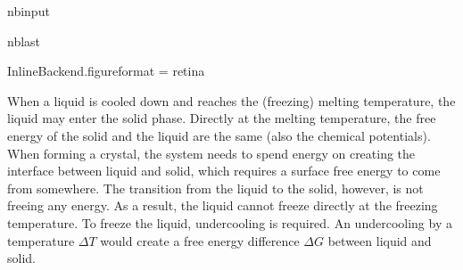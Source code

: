 \documentclass[letterpaper,10pt,english]{sphinxmanual}
\begin{document}
\begin{sphinxuseclass}{nbinput}
\begin{sphinxuseclass}{nblast}
{\begin{sphinxVerbatim}[commandchars=\\\{\}]
 InlineBackend.figure\PYGZus{}format = \PYGZsq{}retina\PYGZsq{}
 
                      
                      
                      
                      
                      
                       
                       
                       
                       
                       
                       
\end{sphinxVerbatim}
}

\end{sphinxuseclass}
\end{sphinxuseclass}
\sphinxAtStartPar
When a liquid is cooled down and reaches the (freezing) melting temperature, the liquid may enter the solid phase. Directly at the melting temperature, the free energy of the solid and the liquid are the same (also the chemical potentials). When forming a crystal, the system needs to spend energy on creating the interface between liquid and solid, which requires a surface free energy to come from somewhere. The transition from the liquid to the solid, however, is not freeing any energy. As a
result, the liquid cannot freeze directly at the freezing temperature. To freeze the liquid, undercooling is required. An undercooling by a temperature \(ΔT\) would create a free energy difference \(ΔG\) between liquid and solid.
\end{document}
